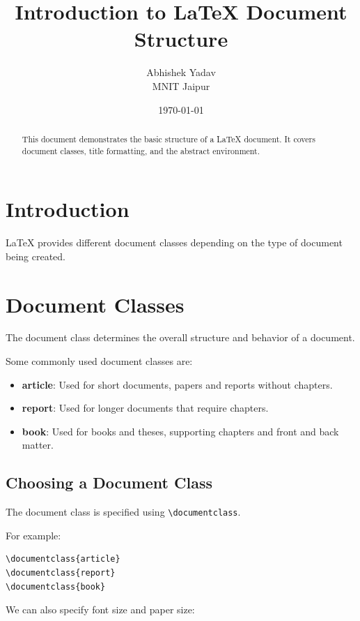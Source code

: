 \documentclass[12pt,a4paper]{article}
\title{\Huge\bfseries Introduction to LaTeX Document Structure}
\author{
    Abhishek Yadav \\
    \small MNIT Jaipur
}
\date{\today}
\begin{document}
\maketitle

\begin{abstract}
This document demonstrates the basic structure of a
LaTeX document. It covers document classes, title
formatting, and the abstract environment.
\end{abstract}

\section{Introduction}

LaTeX provides different document classes depending
on the type of document being created.

\section{Document Classes}

The document class determines the overall structure
and behavior of a document.

Some commonly used document classes are:

\begin{itemize}
    \item \textbf{article}: Used for short documents,
    papers and reports without chapters.

    \item \textbf{report}: Used for longer documents
    that require chapters.

    \item \textbf{book}: Used for books and theses,
    supporting chapters and front and back matter.
\end{itemize}

\subsection{Choosing a Document Class}

The document class is specified using
\texttt{\textbackslash documentclass}.

For example:

\begin{verbatim}
\documentclass{article}
\documentclass{report}
\documentclass{book}
\end{verbatim}

We can also specify font size and paper size:
\end{document}
